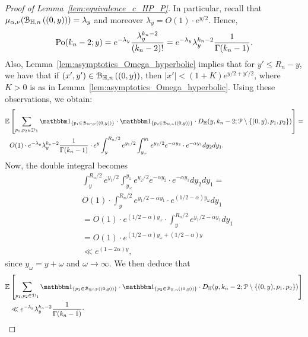\begin{proof}[Proof of Lemma~\ref{lem:equivalence_c_HP_P}]
In particular, recall that $\mu_{\alpha,\nu} (\BallHyp{(0,y)}) = \lambda_y$ and moreover 
$\lambda_y = O(1) \cdot e^{y/2}$. 
Hence, 
\begin{equation}\label{eq:prob_k_n-2}
\Pop{y}{k_n-2}= e^{-\lambda_y} \frac{\lambda_y^{k_n-2}}{(k_n-2)!}  
= e^{-\lambda_y} \lambda_y^{k_n-2} \frac{1}{\Gamma (k_n-1)}.  
\end{equation}
Also, Lemma~\ref{lem:asymptotics_Omega_hyperbolic} implies that for 
$y'\leq R_n -y$, we have that if 
$(x',y') \in \BallHyp{(0,y)}$, then 
$|x'| < (1+ K) e^{y/2 + y'/2}$, where $K >0$ is as in Lemma~\ref{lem:asymptotics_Omega_hyperbolic}. 
Using these observations, we obtain: 
\begin{equation}
\begin{split}
{\mathbb E}& \left[  \sum_{p_1, p_2\in \dom{1}} \ind{p_1 \in \BallInter{(0,y)}} \cdot \ind{p_2 \in \BallHyp{(0,y)}} \cdot 
D_\H (y,k_n-2;\Pcal \setminus \{ (0,y),p_1,p_2\})  \right] = \\
& O(1) \cdot e^{-\lambda_y} \lambda_y^{k_n-2} \frac{1}{\Gamma (k_n-1)} \cdot 
e^{y}\int_y^{R_n/2} e^{y_1/2}\int_{y_\omega}^{y_1} e^{y_2/2} e^{-\alpha y_2} \cdot e^{-\alpha y_1} dy_2 dy_1.
\end{split}
\end{equation} 
Now, the double integral becomes
\begin{equation}
\begin{split}
& \int_y^{R_n/2} e^{y_1/2}\int_{y_\omega}^{y_1} e^{y_2/2} e^{-\alpha y_2} \cdot e^{-\alpha y_1} dy_2 dy_1 = \\
&  O(1) \cdot  \int_y^{R_n/2} e^{y_1/2 - \alpha y_1} \cdot 
e^{(1/2 - \alpha) y_\omega} dy_1 \\
& =O(1) \cdot e^{(1/2 - \alpha) y_\omega} \cdot \int_y^{R_n/2} e^{y_1/2 - \alpha y_1} d y_1 \\
& =O(1) \cdot e^{(1/2 - \alpha) y_\omega + (1/2 - \alpha) y} \\ 
& \ll e^{(1 - 2\alpha) y},
\end{split}
\end{equation}
since $y_\omega = y + \omega$ and $\omega \to \infty$. 
We then deduce that 
\begin{equation}
\begin{split}
{\mathbb E}& \left[  \sum_{p_1, p_2\in \dom{1}} \ind{p_1 \in \BallInter{(0,y)}} \cdot \ind{p_2 \in \BallHyp{(0,y)}} \cdot 
D_\H (y,k_n-2;\Pcal \setminus \{ (0,y),p_1,p_2\})  \right] \\
& \ll  e^{-\lambda_y} \lambda_y^{k_n-2} \frac{1}{\Gamma (k_n-1)} \cdot 

\end{split}
\end{equation}
\end{proof}
